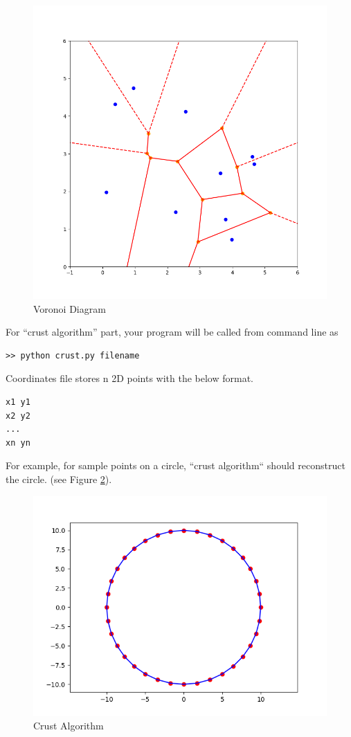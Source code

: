 \documentclass[11pt]{article}
\begin{document}
\begin{enumerate}
\begin{enumerate}
\begin{figure}[H]
  \centering
  \includegraphics[scale=0.4]{points-1.png}
  \caption{Voronoi Diagram}
  \label{fig:voronoi}
\end{figure}

For ``crust algorithm'' part, your program will be called from command line as
\begin{lstlisting}
>> python crust.py filename
\end{lstlisting}

Coordinates file stores n 2D points with the below format.

\begin{lstlisting}
x1 y1
x2 y2
...
xn yn
\end{lstlisting}
For example, for sample points on a circle, ``crust algorithm`` should reconstruct the circle.
(see Figure \ref{fig:crust}).

\begin{figure}[H]
  \centering
  \includegraphics[scale=0.5]{crust.png}
  \caption{Crust Algorithm}
  \label{fig:crust}
\end{figure}


\end{enumerate}
\end{enumerate}
\end{document}
